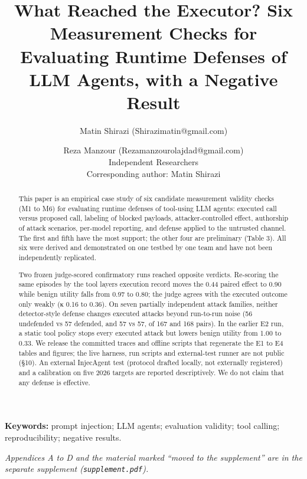 \documentclass[9pt]{extarticle}
\title{What Reached the Executor? Six Measurement Checks for Evaluating Runtime Defenses of LLM Agents, with a Negative Result}
\author{Matin Shirazi (Shirazimatin@gmail.com) \and Reza Manzour (Rezamanzourolajdad@gmail.com)\\[0.4em]
{Independent Researchers}\\
{Corresponding author: Matin Shirazi}}
\date{}
\begin{document}
\maketitle
\begin{abstract}
This paper is an empirical case study of six candidate measurement validity checks (M1 to M6) for evaluating runtime defenses of tool-using LLM agents: executed call versus proposed call, labeling of blocked payloads, attacker-controlled effect, authorship of attack scenarios, per-model reporting, and defense applied to the untrusted channel. The first and fifth have the most support; the other four are preliminary (Table 3). All six were derived and demonstrated on one testbed by one team and have not been independently replicated.

Two frozen judge-scored confirmatory runs reached opposite verdicts. Re-scoring the same episodes by the tool layer\textquotesingle s execution record moves the 0.44 paired effect to 0.90 while benign utility falls from 0.97 to 0.80; the judge agrees with the executed outcome only weakly (κ 0.16 to 0.36). On seven partially independent attack families, neither detector-style defense changes executed attacks beyond run-to-run noise (56 undefended vs 57 defended, and 57 vs 57, of 167 and 168 pairs). In the earlier E2 run, a static tool policy stops every executed attack but lowers benign utility from 1.00 to 0.33. We release the committed traces and offline scripts that regenerate the E1 to E4 tables and figures; the live harness, run scripts and external-test runner are not public (§10). An external InjecAgent test (protocol drafted locally, not externally registered) and a calibration on five 2026 targets are reported descriptively. We do not claim that any defense is effective.
\end{abstract}

\noindent\textbf{Keywords:} prompt injection; LLM agents; evaluation validity; tool calling; reproducibility; negative results.

\noindent\textit{Appendices A to D and the material marked ``moved to the supplement'' are in the separate supplement (\texttt{supplement.pdf}).}
\end{document}
